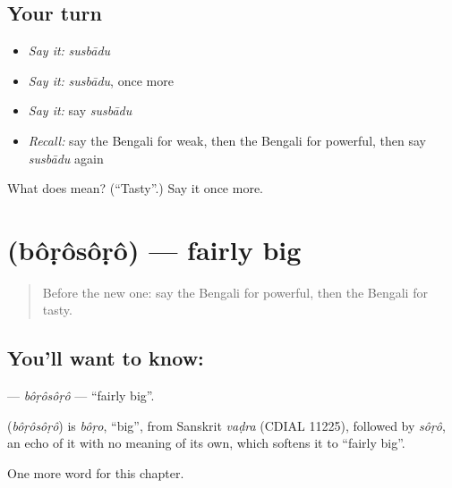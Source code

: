 \subsection*{Your turn}
\begin{itemize}
\raggedright
  \item \emph{Say it:} \emph{susbādu}
  \item \emph{Say it:} \emph{susbādu}, once more
  \item \emph{Say it:} say \emph{susbādu}
  \item \emph{Recall:} say the Bengali for weak, then the Bengali for powerful, then say \emph{susbādu} again
\end{itemize}

\begin{tcolorbox}[breakable,colback=teal!4,colframe=teal!35!black,title={Before you move on}]
What does  mean? (\textquotedblleft{}Tasty\textquotedblright{}.) Say it once more.
\end{tcolorbox}
\section[\texorpdfstring{\bn{বড়সড়} (bôṛôsôṛô)}{বড়সড় (bôṛôsôṛô)}]{ (bôṛôsôṛô) — fairly big}

\label{lesson:BN-C143-borosoro}



\begin{quote}
Before the new one: say the Bengali for powerful, then the Bengali for tasty.
\end{quote}

\subsection*{You'll want to know: }
\textbf{} — \emph{bôṛôsôṛô} — \textquotedblleft{}fairly big\textquotedblright{}.

\begin{cousinweb}
\textbf{} (\emph{bôṛôsôṛô}) is \emph{bôṛo}, \textquotedblleft{}big\textquotedblright{}, from Sanskrit \emph{vaḍra} (CDIAL 11225), followed by \emph{sôṛô}, an echo of it with no meaning of its own, which softens it to \textquotedblleft{}fairly big\textquotedblright{}.
\end{cousinweb}

\begin{grammarlens}[title={What you've built}]
One more word for this chapter.
\end{grammarlens}

